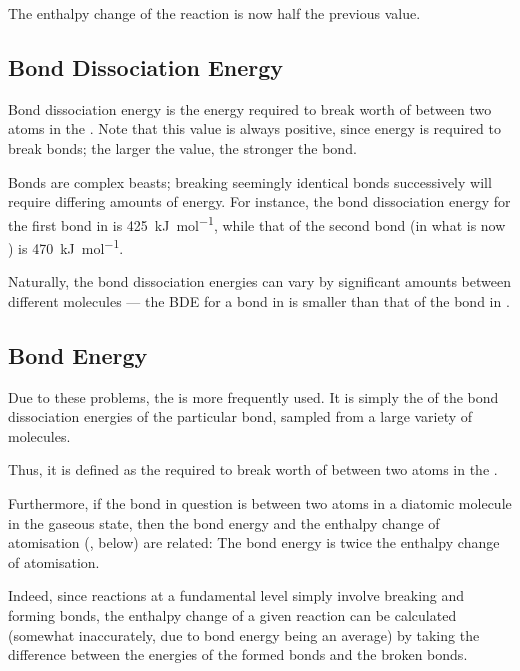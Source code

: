 			The enthalpy change of the reaction is now half the previous value.


		\subsection{Bond Dissociation Energy}

			Bond dissociation energy is the energy required to break  worth of  between two atoms in the
			. Note that this value is always positive, since energy is required to break bonds; the larger the value,
			the stronger the bond.

			Bonds are complex beasts; breaking seemingly identical bonds successively will require differing amounts of energy. For instance, the
			bond dissociation energy for the first  bond in  is \SI{425}{\kilo\joule\per\mole}, while that of the second 
			bond (in what is now ) is \SI{470}{\kilo\joule\per\mole}.

			Naturally, the bond dissociation energies can vary by significant amounts between different molecules --- the BDE for a  bond
			in  is smaller than that of the  bond in .


		\pagebreak
		\subsection{Bond Energy}

			Due to these problems, the  is more frequently used. It is simply the  of the bond dissociation
			energies of the particular bond, sampled from a large variety of molecules.

			Thus, it is defined as the  required to break  worth of  between two
			atoms in the .

			Furthermore, if the bond in question is between two atoms in a diatomic molecule in the gaseous state, then the bond energy and
			the enthalpy change of atomisation (, below) are related: The bond energy is twice the enthalpy change of atomisation.


			Indeed, since reactions at a fundamental level simply involve breaking and forming bonds, the enthalpy change of a given reaction
			can be calculated (somewhat inaccurately, due to bond energy being an average) by taking the difference between the energies of the
			formed bonds and the broken bonds.

